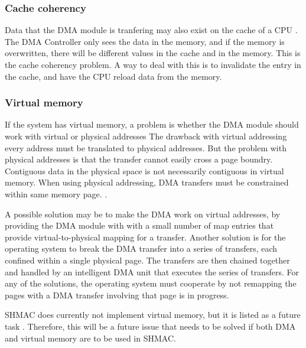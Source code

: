 \subsubsection{Cache coherency}
Data that the DMA module is tranfering may also exist on the cache of a CPU \cite[p~594-595]{computer-construction}.
The DMA Controller only sees the data in the memory, and if the memory is overwritten, there will be different values in the cache and in the memory.
This is the cache coherency problem.
A way to deal with this is to invalidate the entry in the cache, and have the CPU reload data from the memory.

\subsubsection{Virtual memory}
If the system has virtual memory, a problem is whether the DMA module should work with virtual or physical addresses 
The drawback with virtual addressing every address must be translated to physical addresses.
But the problem with physical addresses is that the transfer cannot easily cross a page boundry.
Contiguous data in the physical space is not necessarily contiguous in virtual memory.
When using physical addressing, DMA transfers must be constrained within same memory page. \cite{computer-construction}.

A possible solution may be to make the DMA work on virtual addresses, by providing the DMA module with with a small number of map entries that provide virtual-to-physical mapping for a transfer.
Another solution is for the operating system to break the DMA transfer into a series of transfers, each confined within a single physical page.
The transfers are then chained together and handled by an intelligent DMA unit that executes the series of transfers. 
For any of the solutions, the operating system must cooperate by not remapping the pages with a DMA transfer involving that page is in progress.

SHMAC does currently not implement virtual memory, but it is listed as a future task \cite{shmac-plan}.
Therefore, this will be a future issue that needs to be solved if both DMA and virtual memory are to be used in SHMAC. 

